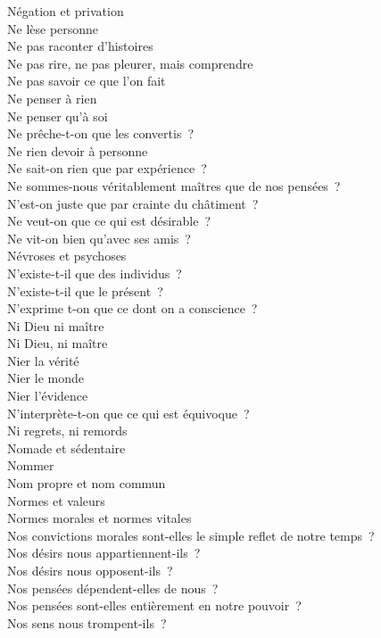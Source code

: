 \documentclass[a4paper,12pt]{article}
\begin{document}
Négation et privation \\
Ne lèse personne \\
Ne pas raconter d'histoires \\
Ne pas rire, ne pas pleurer, mais comprendre \\
Ne pas savoir ce que l'on fait \\
Ne penser à rien \\
Ne penser qu'à soi \\
Ne prêche-t-on que les convertis ? \\
Ne rien devoir à personne \\
Ne sait-on rien que par expérience ? \\
Ne sommes-nous véritablement maîtres que de nos pensées ? \\
N'est-on juste que par crainte du châtiment ? \\
Ne veut-on que ce qui est désirable ? \\
Ne vit-on bien qu'avec ses amis ? \\
Névroses et psychoses \\
N'existe-t-il que des individus ? \\
N'existe-t-il que le présent ? \\
N'exprime t-on que ce dont on a conscience ? \\
Ni Dieu ni maître \\
Ni Dieu, ni maître \\
Nier la vérité \\
Nier le monde \\
Nier l'évidence \\
N'interprète-t-on que ce qui est équivoque ? \\
Ni regrets, ni remords \\
Nomade et sédentaire \\
Nommer \\
Nom propre et nom commun \\
Normes et valeurs \\
Normes morales et normes vitales \\
Nos convictions morales sont-elles le simple reflet de notre temps ? \\
Nos désirs nous appartiennent-ils ? \\
Nos désirs nous opposent-ils ? \\
Nos pensées dépendent-elles de nous ? \\
Nos pensées sont-elles entièrement en notre pouvoir ? \\
Nos sens nous trompent-ils ? \\
\end{document}
